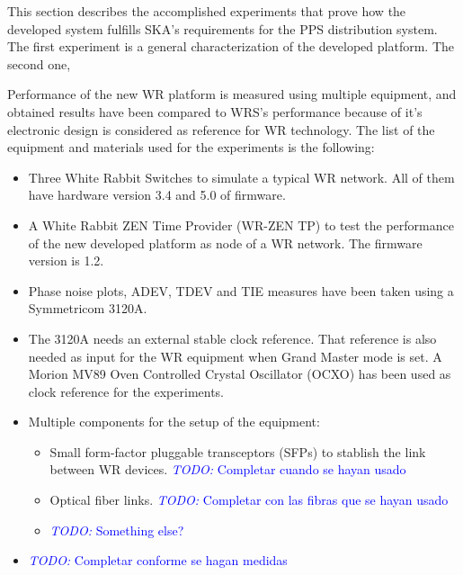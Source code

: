
This section describes the accomplished experiments that prove how the 
developed system fulfills SKA's requirements for the PPS distribution system. 
 The first experiment is a general 
characterization of the developed platform. The second one, 

Performance of the new WR platform is measured using multiple equipment, and obtained results have been compared to WRS's performance because of it's electronic design is considered as reference for WR technology. The list of the equipment and materials used for the experiments is the following:

\begin{itemize}
    \item Three White Rabbit Switches to simulate a typical WR network. All of them have hardware version 3.4 and 5.0 of firmware.
    \item A White Rabbit ZEN Time Provider (WR-ZEN TP) to test the performance of the new developed platform as node of a WR network. The firmware version is 1.2.
    \item Phase noise plots, ADEV, TDEV and TIE measures have been taken using a Symmetricom 3120A.
    \item The 3120A needs an external stable clock reference. That reference is also needed as input for the WR equipment when Grand Master mode is set. A Morion MV89 Oven Controlled Crystal Oscillator (OCXO) has been used as clock reference for the experiments.
    \item Multiple components for the setup of the equipment:
    \begin{itemize}
        \item Small form-factor pluggable transceptors (SFPs) to stablish the link between WR devices.  \textcolor{blue}{\textit{TODO:} Completar cuando se hayan usado}
        \item Optical fiber links. \textcolor{blue}{\textit{TODO:} Completar con las fibras que se hayan usado}
        \item \textcolor{blue}{\textit{TODO:} Something else?}
    \end{itemize}
    \item \textcolor{blue}{\textit{TODO:} Completar conforme se hagan medidas}
\end{itemize}

